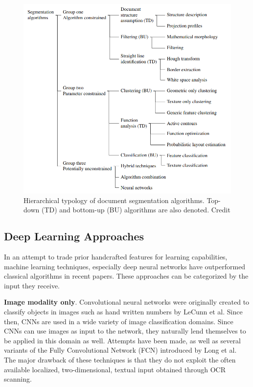 \documentclass[english, bibtex]{kththesis}
\begin{document}
\begin{figure}[H]
  \begin{center}
    \includegraphics[width=1.0\textwidth]{figures/classicalalgs.png}
  \end{center}
  \caption{Hierarchical typology of document segmentation algorithms. Top-down (TD) and bottom-up (BU) algorithms are also denoted. Credit\cite{Rekathati_2020} }
  \label{fig:classicalgs}
\end{figure}

\subsection{Deep Learning Approaches}

In an attempt to trade prior handcrafted features for learning capabilities, machine learning techniques, especially deep neural networks have outperformed classical algorithms in recent papers. These approaches can be categorized by the input they receive.

\textbf{Image modality only}. Convolutional neural networks were originally created to classify objects in images such as hand written numbers by LeCunn et al\cite{lecun1989}. Since then, CNNs are used in a wide variety of image classification domains\cite{deng2009}. Since CNNs can use images as input to the network, they naturally lend themselves to be applied in this domain as well. Attempts have been made\cite{DBLP:journals/corr/0011S17}, as well as several variants\cite{he2017}\cite{xu2017}\cite{wickpuppe2018}\cite{oliveira2018} of the Fully Convolutional Network (FCN) introduced by Long et al\cite{DBLP:journals/corr/LongSD14}. The major drawback of these techniques is that they do not exploit the often available localized, two-dimensional, textual input obtained through OCR scanning.  
\end{document}
